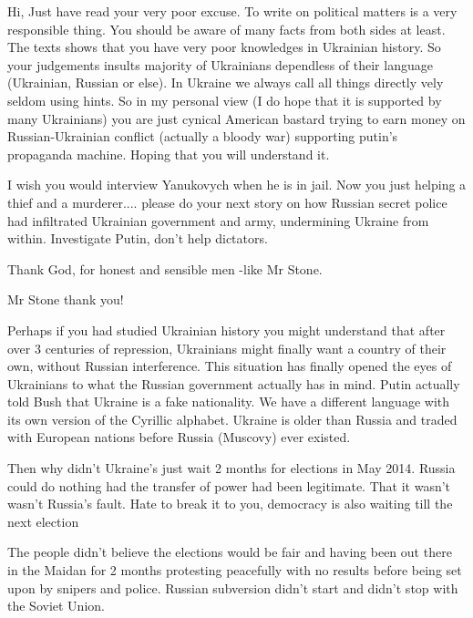 \begin{itemize}
Hi, Just have read your very poor excuse. To write on political matters is a very
responsible thing. You should be aware of many facts from both sides at least.
The texts shows that you have very poor knowledges in Ukrainian history. So your
judgements insults majority of Ukrainians dependless of their
language (Ukrainian, Russian or else). In Ukraine we always call all things
directly vely seldom using hints. So in my personal view (I do hope that it is
supported by many Ukrainians) you are just cynical American bastard trying to
earn money on Russian-Ukrainian conflict (actually a bloody war) supporting
putin's propaganda machine. Hoping that you will understand it.


I wish you would interview Yanukovych when he is in jail. Now you just helping
a thief and a murderer.... please do your next story on how Russian secret
police had infiltrated Ukrainian government and army, undermining Ukraine from
within. Investigate Putin, don't help dictators.

Thank God, for honest and sensible men -like Mr Stone.

Mr Stone thank you!


Perhaps if you had studied Ukrainian history you might understand that after
over 3 centuries of repression, Ukrainians might finally want a country of
their own, without Russian interference. This situation has finally opened the
eyes of Ukrainians to what the Russian government actually has in mind. Putin
actually told Bush that Ukraine is a fake nationality. We have a different
language with its own version of the Cyrillic alphabet. Ukraine is older than
Russia and traded with European nations before Russia (Muscovy) ever existed.

\begin{itemize} %

Then why didn't Ukraine's just wait 2 months for elections in May 2014. Russia
could do nothing had the transfer of power had been legitimate. That it wasn't
wasn't Russia's fault. Hate to break it to you, democracy is also waiting till
the next election


The people didn't believe the elections would be fair and having been out there
in the Maidan for 2 months protesting peacefully with no results before being
set upon by snipers and police. Russian subversion didn't start and didn't stop
with the Soviet Union.


\end{itemize}
\end{itemize}
